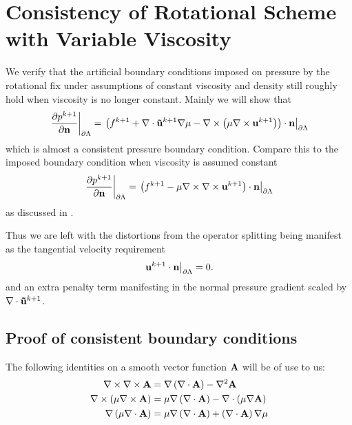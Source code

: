 \documentclass[letterpaper]{erdc}
\begin{document}
\section{Consistency of Rotational Scheme with Variable Viscosity }
We verify that the artificial boundary conditions imposed on pressure by the
rotational fix under assumptions of constant viscosity and density still
roughly hold when viscosity is no longer constant.  Mainly we will show that
\begin{equation}
  \left.\frac{\partial p^{k+1}}{\partial \textbf{n}}\right|_{\partial\Lambda} = \left.\left(f^{k+1} + \nabla\cdot\mathbf{\tilde{u}}^{k+1}\nabla\mu - \nabla\times\left(\mu\nabla\times \textbf{u}^{k+1}  \right)  \right)\cdot \textbf{n}\right|_{\partial\Lambda}
\end{equation}
which is almost a consistent pressure boundary condition.  Compare this to the
imposed boundary condition when viscosity is assumed constant
\begin{equation}
  \left.\frac{\partial p^{k+1}}{\partial \textbf{n}}\right|_{\partial\Lambda} = \left.\left(f^{k+1} - \mu\nabla\times\nabla\times \textbf{u}^{k+1} \right)\cdot \textbf{n}\right|_{\partial\Lambda}
\end{equation}
as discussed in \cite{guermond2004error}.
 
Thus we are left with the distortions from the operator splitting being
manifest as the tangential velocity requirement
\begin{equation}
  \left.\textbf{u}^{k+1}\cdot\textbf{n}\right|_{\partial\Lambda} = 0.
\end{equation}
and an extra penalty term manifesting in the normal pressure gradient scaled by
$\nabla\cdot\mathbf{\tilde{u}}^{k+1}$.



%
%
\subsection{Proof of consistent boundary conditions}
The following identities on a smooth vector function $\mathbf{A}$ will be of use to
us:
\begin{align}
  \nabla\times\nabla\times \mathbf{A} &= \nabla\left( \nabla\cdot \mathbf{A}\right) - \nabla^2 \mathbf{A}\label{eqn:curlcurlidentity}\\
  \nabla\times\left( \mu \nabla\times \mathbf{A} \right) &= \mu\nabla\left(\nabla\cdot \mathbf{A}\right) - \nabla\cdot\left(\mu \nabla \mathbf{A} \right)\label{eqn:curlmucurlidentity}\\
  \nabla\left( \mu \nabla\cdot \mathbf{A}\right) &= \mu\nabla\left(\nabla\cdot \mathbf{A}\right) + \left( \nabla\cdot \mathbf{A}\right)\nabla\mu\label{eqn:gradmudividentity}
\end{align}
\end{document}

